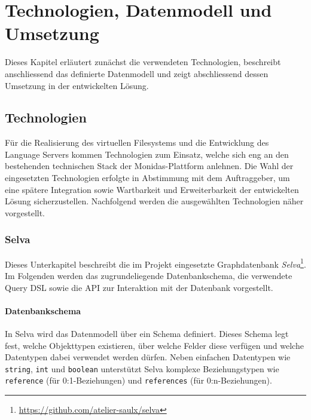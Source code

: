 \section{Technologien, Datenmodell und Umsetzung}
Dieses Kapitel erläutert zunächst die verwendeten Technologien, beschreibt anschliessend das definierte Datenmodell und zeigt abschliessend dessen Umsetzung in der entwickelten Lösung.

\subsection{Technologien}
Für die Realisierung des virtuellen Filesystems und die Entwicklung des Language Servers kommen Technologien zum Einsatz, welche sich eng an den bestehenden technischen Stack der Monidas-Plattform anlehnen. Die Wahl der eingesetzten Technologien erfolgte in Abstimmung mit dem Auftraggeber, um eine spätere Integration sowie Wartbarkeit und Erweiterbarkeit der entwickelten Lösung sicherzustellen. Nachfolgend werden die ausgewählten Technologien näher vorgestellt. 


\subsubsection{Selva}
Dieses Unterkapitel beschreibt die im Projekt eingesetzte Graphdatenbank \textit{Selva}\footnote{\url{https://github.com/atelier-saulx/selva}}. Im Folgenden werden das zugrundeliegende Datenbankschema, die verwendete Query DSL sowie die API zur Interaktion mit der Datenbank vorgestellt.


\paragraph{Datenbankschema}
In Selva wird das Datenmodell über ein Schema definiert. Dieses Schema legt fest, welche Objekttypen existieren, über welche Felder diese verfügen und welche Datentypen dabei verwendet werden dürfen. Neben einfachen Datentypen wie \texttt{string}, \texttt{int} und \texttt{boolean} unterstützt Selva komplexe Beziehungstypen wie \texttt{reference} (für 0:1-Beziehungen) und \texttt{references} (für 0:n-Beziehungen).

